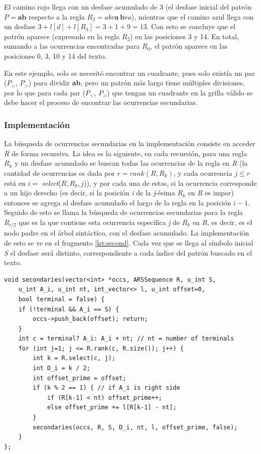 El camino rojo llega con un desfase acumulado de 3 (el desfase inicial del patrón $P = \textbf{ab}$ respecto a la regla $R_2 = abr\textbf{a}\ \textbf{b}ra$), mientras que el camino azul llega con un desfase $3 + l[d] + l[R_3] = 3 + 1 + 9 = 13$. Con esto se concluye que el patrón aparece (expresado en la regla $R_2$) en las posiciones 3 y 14. En total, sumando a las ocurrencias encontradas para $R_0$, el patrón aparece en las posiciones 0, 3, 10 y 14 del texto.

En este ejemplo, solo se necesitó encontrar un cuadrante, pues solo existía un par ($P_<$, $P_>$) para dividir \textbf{ab}, pero un patrón más largo tiene múltiples divisiones, por lo que para cada par ($P_<$, $P_>$) que tengan un cuadrante en la grilla válido se debe hacer el proceso de encontrar las ocurrencias secundarias.

\subsubsection{Implementación}
 
La búsqueda de ocurrencias secundarias en la implementación consiste en acceder \textit{R} de forma recursiva. La idea es la siguiente, en cada recursión, para una regla $R_k$ y un desfase acumulado se buscan todas las ocurrencias de la regla en \textit{R} (la cantidad de ocurrencias es dada por $r = rank (R, R_k)$, y cada ocurrencia $j \leq r$ está en $i =$ \textit{select}($R, R_{k}, j$)), y por cada una de estas, si la ocurrencia corresponde a un hijo derecho (es decir, si la posición \textit{i} de la \textit{j}-ésima $R_k$ en \textit{R} es impar) entonces se agrega al desfase acumulado el largo de la regla en la posición $i-1$. Seguido de esto se llama la búsqueda de ocurrencias secundarias para la regla $R_{i/2}$ que es la que contiene esta ocurrencia específica \textit{j} de $R_k$ en \textit{R}, es decir, es el nodo padre en el árbol sintáctico, con el desfase acumulado. La implementación de esto se ve en el fragmento \ref{lst:second}. Cada vez que se llega al símbolo inicial \textit{S} el desfase será distinto, correspondiente a cada índice del patrón buscado en el texto.

\begin{lstlisting}[style=cppstyle, caption={Ocurrencias}, label={lst:second}]
void secondaries(vector<int> *occs, ARSSequence R, u_int S,
    u_int A_i, u_int nt, int_vector<> l, u_int offset=0,
    bool terminal = false) {
    if (!terminal && A_i == S) { 
        occs->push_back(offset); return;
    }
    int c = terminal? A_i: A_i + nt; // nt = number of terminals
    for (int j=1; j <= R.rank(c, R.size()); j++) {
        int k = R.select(c, j);
        int D_i = k / 2;
        int offset_prime = offset;
        if (k % 2 == 1) { // if A_i is right side
            if (R[k-1] < nt) offset_prime++;
            else offset_prime += l[R[k-1] - nt]; 
        }
        secondaries(occs, R, S, D_i, nt, l, offset_prime, false);
    }
};
\end{lstlisting}

